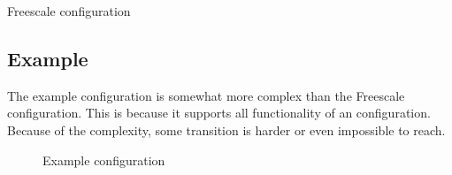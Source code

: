 \begin{table}[!h]
  \caption{Freescale configuration}
  \label{TABLE:STATUSES_FREESCALE}
  
\end{table}

\subsection{Example}
The example configuration is somewhat more complex than the Freescale
configuration. This is because it supports all functionality of an
configuration. Because of the complexity, some transition is harder or even
impossible to reach.

\begin{figure}[h!]
  \begin{center}

  \end{center}
  \caption{Example configuration}
  \label{FIG:EXAMPLE}
\end{figure}

